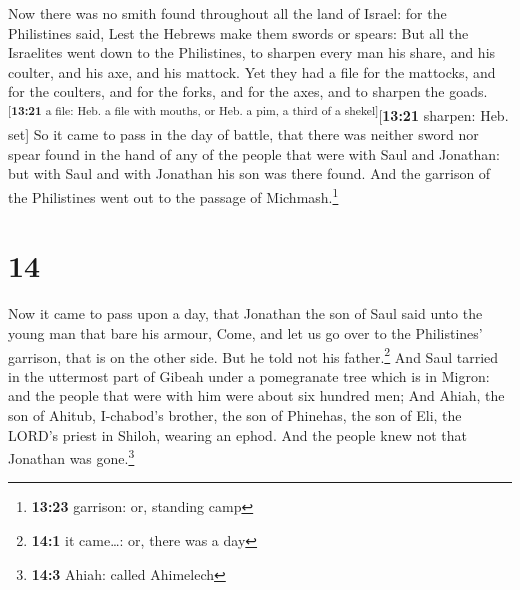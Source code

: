  Now there was no smith found throughout all the land of
Israel: for the Philistines said, Lest the Hebrews make them swords or
spears:  But all the Israelites went down to the
Philistines, to sharpen every man his share, and his coulter, and his
axe, and his mattock.  Yet they had a file for the
mattocks, and for the coulters, and for the forks, and for the axes, and
to sharpen the goads.\textsuperscript{{[}\textbf{13:21} a file: Heb. a
file with mouths, or Heb. a pim, a third of a
shekel{]}}{[}\textbf{13:21} sharpen: Heb. set{]}  So it
came to pass in the day of battle, that there was neither sword nor
spear found in the hand of any of the people that were with Saul and
Jonathan: but with Saul and with Jonathan his son was there found.
 And the garrison of the Philistines went out to the
passage of Michmash.\footnote{\textbf{13:23} garrison: or, standing camp}

\hypertarget{section-13}{%
\section{14}\label{section-13}}

 Now it came to pass upon a day, that Jonathan the son of
Saul said unto the young man that bare his armour, Come, and let us go
over to the Philistines' garrison, that is on the other side. But he
told not his father.\footnote{\textbf{14:1} it came\ldots: or, there was
  a day}  And Saul tarried in the uttermost part of Gibeah
under a pomegranate tree which is in Migron: and the people that were
with him were about six hundred men;  And Ahiah, the son
of Ahitub, I-chabod's brother, the son of Phinehas, the son of Eli, the
LORD's priest in Shiloh, wearing an ephod. And the people knew not that
Jonathan was gone.\footnote{\textbf{14:3} Ahiah: called Ahimelech}

